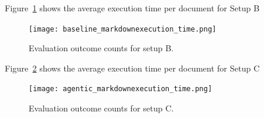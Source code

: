 Figure~\ref{fig:baseline_markdownexecution_time} shows the average execution time
per document for Setup B

\begin{figure}[H]
  \centering
  \texttt{[image: baseline\_markdownexecution\_time.png]}
  \caption{Evaluation outcome counts for setup B.}
  \label{fig:baseline_markdownexecution_time}
\end{figure}

Figure~\ref{fig:agentic_markdownexecution_time} shows the average execution
time per document for Setup C

\begin{figure}[H]
  \centering
  \texttt{[image: agentic\_markdownexecution\_time.png]}
  \caption{Evaluation outcome counts for setup C.}
  \label{fig:agentic_markdownexecution_time}
\end{figure}

